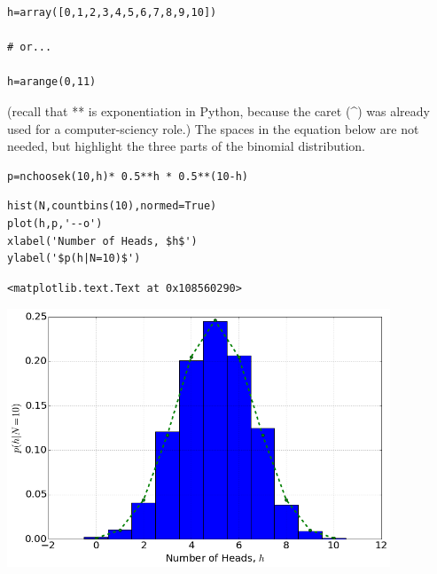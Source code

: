 \begin{lstlisting}
h=array([0,1,2,3,4,5,6,7,8,9,10])

# or...

h=arange(0,11)
\end{lstlisting}

(recall that ** is exponentiation in Python, because the caret (\^{}) was
already used for a computer-sciency role.)  The spaces in the equation below are
not needed, but highlight the three parts of the binomial distribution.

\begin{lstlisting}
p=nchoosek(10,h)* 0.5**h * 0.5**(10-h)
\end{lstlisting}

\begin{lstlisting}
hist(N,countbins(10),normed=True)
plot(h,p,'--o')
xlabel('Number of Heads, $h$')
ylabel('$p(h|N=10)$')
\end{lstlisting}

\begin{verbatim}
<matplotlib.text.Text at 0x108560290>
\end{verbatim}

\begin{center}\includegraphics[width=4.5in]{Applications_of_Probability/Applications_of_Probability_fig1.png}\end{center}

